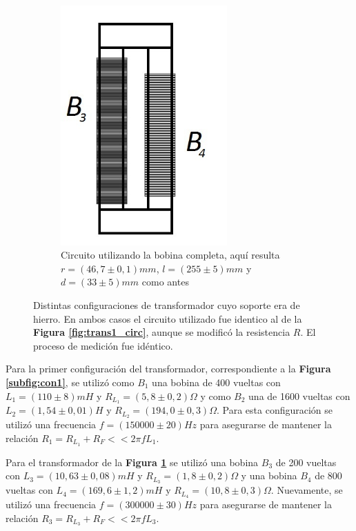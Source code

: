 \documentclass[11pt,a4paper]{article}
\begin{document}
\begin{figure}[h!]
\begin{subfigure}{0.5\textwidth}
      \includegraphics[width=0.7\textwidth]{configuracion2}
      \caption{Circuito utilizando la bobina completa, aquí resulta $r = (46,7 \pm 0,1)mm$, $l = (255 \pm 5)mm$ y $d = (33 \pm 5)mm$ como antes}  
      \label{subfig:con2}
   \end{subfigure}
   \caption{Distintas configuraciones de transformador cuyo soporte era de hierro. En ambos casos el circuito utilizado fue identico al de la \textbf{Figura \ref{fig:trans1_circ}}, aunque se modificó la resistencia $R$. El proceso de medición fue idéntico.}
   \label{fig:configs}
\end{figure}

Para la primer configuración del transformador, correspondiente a la \textbf{Figura \ref{subfig:con1}}, se utilizó como $B_1$ una bobina de 400 vueltas con $L_1 = (110 \pm 8)mH$ y $R_{L_1} = (5,8 \pm 0,2)\Omega$ y como $B_2$ una de 1600 vueltas con $L_2 = (1,54 \pm 0,01)H$ y $R_{L_2} = (194,0 \pm 0,3)\Omega$. Para esta configuración se utilizó una frecuencia $f = (150000 \pm 20)Hz$ para asegurarse de mantener la relación $R_1 = R_{L_1}+R_F << 2\pi fL_1$.

Para el transformador de la \textbf{Figura \ref{subfig:con2}} se utilizó una bobina $B_3$ de 200 vueltas con $L_3 = (10,63 \pm 0,08)mH$ y $R_{L_3} = (1,8 \pm 0,2)\Omega$ y una bobina $B_4$ de 800 vueltas con $L_4 = (169,6 \pm 1,2)mH$ y $R_{L_4} = (10,8 \pm 0,3)\Omega$. Nuevamente,  se utilizó una frecuencia $f = (300000 \pm 30)Hz$ para asegurarse de mantener la relación $R_3 = R_{L_3}+R_F << 2\pi fL_3$.
\end{document}
